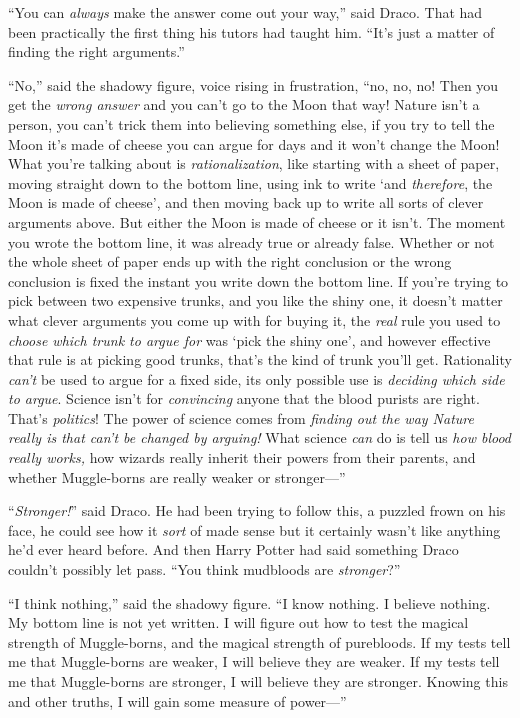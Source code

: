 “You can \emph{always} make the answer come out your way,” said Draco. That had been practically the first thing his tutors had taught him. “It’s just a matter of finding the right arguments.”

“No,” said the shadowy figure, voice rising in frustration, “no, no, no! Then you get the \emph{wrong answer} and you can’t go to the Moon that way! Nature isn’t a person, you can’t trick them into believing something else, if you try to tell the Moon it’s made of cheese you can argue for days and it won’t change the Moon! What you’re talking about is \emph{rationalization}, like starting with a sheet of paper, moving straight down to the bottom line, using ink to write ‘and \emph{therefore}, the Moon is made of cheese’, and then moving back up to write all sorts of clever arguments above. But either the Moon is made of cheese or it isn’t. The moment you wrote the bottom line, it was already true or already false. Whether or not the whole sheet of paper ends up with the right conclusion or the wrong conclusion is fixed the instant you write down the bottom line. If you’re trying to pick between two expensive trunks, and you like the shiny one, it doesn’t matter what clever arguments you come up with for buying it, the \emph{real} rule you used to \emph{choose which trunk to argue for} was ‘pick the shiny one’, and however effective that rule is at picking good trunks, that’s the kind of trunk you’ll get. Rationality \emph{can’t} be used to argue for a fixed side, its only possible use is \emph{deciding which side to argue}. Science isn’t for \emph{convincing} anyone that the blood purists are right. That’s \emph{politics}! The power of science comes from \emph{finding out the way Nature really is that can’t be changed by arguing!} What science \emph{can} do is tell us \emph{how blood really works,} how wizards really inherit their powers from their parents, and whether Muggle-borns are really weaker or stronger—”

“\emph{Stronger!}” said Draco. He had been trying to follow this, a puzzled frown on his face, he could see how it \emph{sort} of made sense but it certainly wasn’t like anything he’d ever heard before. And then Harry Potter had said something Draco couldn’t possibly let pass. “You think mudbloods are \emph{stronger}?”

“I think nothing,” said the shadowy figure. “I know nothing. I believe nothing. My bottom line is not yet written. I will figure out how to test the magical strength of Muggle-borns, and the magical strength of purebloods. If my tests tell me that Muggle-borns are weaker, I will believe they are weaker. If my tests tell me that Muggle-borns are stronger, I will believe they are stronger. Knowing this and other truths, I will gain some measure of power—”


